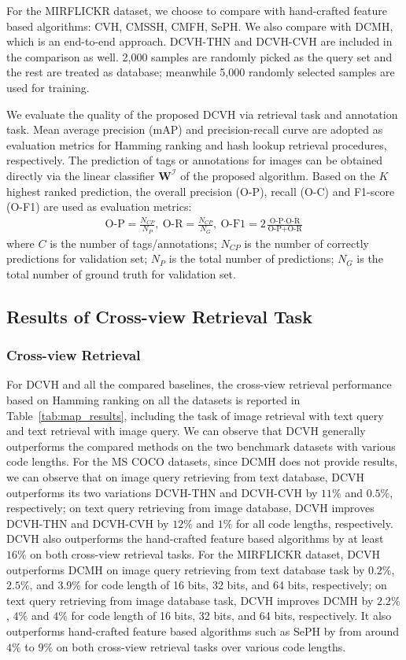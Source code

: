 \documentclass[10pt,twocolumn,letterpaper]{article}
\begin{document}
For the MIRFLICKR dataset, we choose to compare with hand-crafted feature based algorithms: CVH, CMSSH, CMFH, SePH. We also compare with DCMH, which is an end-to-end approach. DCVH-THN and DCVH-CVH are included in the comparison as well. 2,000 samples are randomly picked as the query set and the rest are treated as database; meanwhile 5,000 randomly selected samples are used for training.

We evaluate the quality of the proposed DCVH via retrieval task and annotation task. Mean average precision (mAP) and precision-recall curve are adopted as evaluation metrics for Hamming ranking and hash lookup retrieval procedures, respectively. The prediction of tags or annotations for images can be obtained directly via the linear classifier $\mathbf{W}^{\mathcal{I}}$ of the proposed algorithm. Based on the $K$ highest ranked prediction, the overall precision (O-P), recall (O-C) and F1-score (O-F1) are used as evaluation metrics:
\begin{align}
\text{O-P} = \frac{N_{CP}}{N_P},\ \text{O-R} = \frac{N_{CP}}{N_G},\ \text{O-F1} = 2\frac{\text{O-P}\cdot \text{O-R}}{\text{O-P}+\text{O-R}}
\end{align}
where $C$ is the number of tags/annotations; $N_{CP}$ is the number of correctly predictions for validation set; $N_P$ is the total number of predictions; $N_G$ is the total number of ground truth for validation set.

\subsection{Results of Cross-view Retrieval Task}

\subsubsection{Cross-view Retrieval}

For DCVH and all the compared baselines, the cross-view retrieval performance based on Hamming ranking on all the datasets is reported in Table~\ref{tab:map_results}, including the task of image retrieval with text query and text retrieval with image query. We can observe that DCVH generally outperforms the compared methods on the two benchmark datasets with various code lengths. For the MS COCO datasets, since DCMH does not provide results, we can observe that on image query retrieving from text database, DCVH outperforms its two variations DCVH-THN and DCVH-CVH by $11\%$ and $0.5\%$, respectively; on text query retrieving from image database, DCVH improves DCVH-THN and DCVH-CVH by $12\%$ and $1\%$ for all code lengths, respectively. DCVH also outperforms the hand-crafted feature based algorithms by at least $16\%$ on both cross-view retrieval tasks. For the MIRFLICKR dataset, DCVH outperforms DCMH on image query retrieving from text database task by $0.2\%$, $2.5\%$, and $3.9\%$ for code length of 16 bits, 32 bits, and 64 bits, respectively; on text query retrieving from image database task, DCVH improves DCMH by $2.2\%$, $4\%$ and $4\%$ for code length of 16 bits, 32 bits, and 64 bits, respectively. It also outperforms hand-crafted feature based algorithms such as SePH by from around $4\%$ to $9\%$ on both cross-view retrieval tasks over various code lengths.
\end{document}
